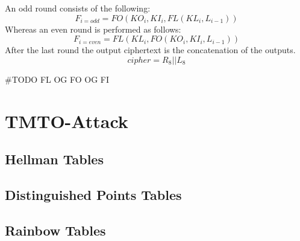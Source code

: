 An odd round consists of the following:
\[F_{i = odd} = FO(KO_i, KI_i, FL(KL_i, L_{i - 1})) \]
Whereas an even round is performed as follows:
\[F_{i = even} = FL(KL_i, FO(KO_i,KI_i, L_{i - 1})) \]
After the last round the output ciphertext is the concatenation of the
outputs.
\[cipher = R_8 || L_8\]

#TODO
FL OG FO OG FI

\section{TMTO-Attack}



\subsection{Hellman Tables}

\subsection{Distinguished Points Tables}

\subsection{Rainbow Tables}

